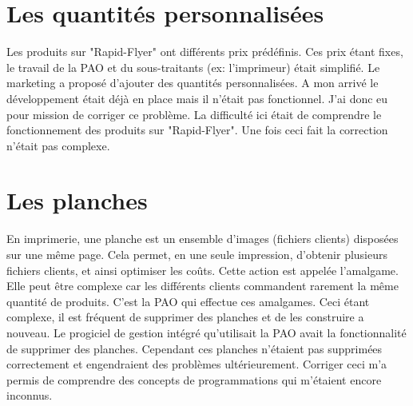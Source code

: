 \section{Les quantités personnalisées}
Les produits sur "Rapid-Flyer" ont différents prix prédéfinis. Ces prix étant fixes, le travail de la PAO et du sous-traitants (ex: l'imprimeur) était simplifié.\newline
Le marketing a proposé d'ajouter des quantités personnalisées. A mon arrivé le développement était déjà en place mais il n'était pas fonctionnel. J'ai donc eu pour mission de corriger ce problème. La difficulté ici était de comprendre le fonctionnement des produits sur "Rapid-Flyer". Une fois ceci fait la correction n'était pas complexe.

\section{Les planches}
En imprimerie, une planche est un ensemble d'images (fichiers clients) disposées sur une même page. Cela permet, en une seule impression, d'obtenir plusieurs fichiers clients, et ainsi optimiser les coûts. Cette action est appelée l'amalgame. Elle peut être complexe car les différents clients commandent rarement la même quantité de produits. C'est la PAO qui effectue ces amalgames. Ceci étant complexe, il est fréquent de supprimer des planches et de les construire a nouveau.\newline
Le progiciel de gestion intégré qu'utilisait la PAO avait la fonctionnalité de supprimer des planches. Cependant ces planches n'étaient pas supprimées correctement et engendraient des problèmes ultérieurement. Corriger ceci m'a permis de comprendre des concepts de programmations qui m'étaient encore inconnus.